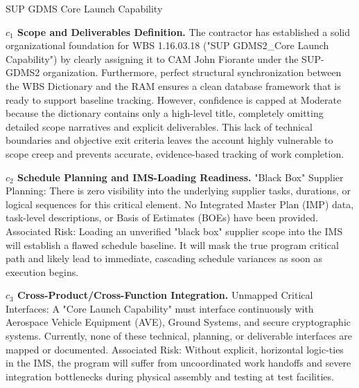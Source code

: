 \begin{frame}{SUP GDMS Core Launch Capability}
\begin{minipage}{0.90\textwidth}
\raggedright
\fontsize{8}{9.5}\selectfont
\textbf{\(c_1\) Scope and Deliverables Definition.}
The contractor has established a solid organizational foundation for WBS 1.16.03.18 ("SUP GDMS2\_Core Launch Capability") by clearly assigning it to CAM John Fiorante under the SUP-GDMS2 organization. Furthermore, perfect structural synchronization between the WBS Dictionary and the RAM ensures a clean database framework that is ready to support baseline tracking. However, confidence is capped at Moderate because the dictionary contains only a high-level title, completely omitting detailed scope narratives and explicit deliverables. This lack of technical boundaries and objective exit criteria leaves the account highly vulnerable to scope creep and prevents accurate, evidence-based tracking of work completion.\par\vspace{0.6em}
\textbf{\(c_2\) Schedule Planning and IMS-Loading Readiness.}
"Black Box" Supplier Planning: There is zero visibility into the underlying supplier tasks, durations, or logical sequences for this critical element. No Integrated Master Plan (IMP) data, task-level descriptions, or Basis of Estimates (BOEs) have been provided. Associated Risk: Loading an unverified "black box" supplier scope into the IMS will establish a flawed schedule baseline. It will mask the true program critical path and likely lead to immediate, cascading schedule variances as soon as execution begins.\par\vspace{0.6em}
\textbf{\(c_3\) Cross-Product/Cross-Function Integration.}
Unmapped Critical Interfaces: A "Core Launch Capability" must interface continuously with Aerospace Vehicle Equipment (AVE), Ground Systems, and secure cryptographic systems. Currently, none of these technical, planning, or deliverable interfaces are mapped or documented. Associated Risk: Without explicit, horizontal logic-ties in the IMS, the program will suffer from uncoordinated work handoffs and severe integration bottlenecks during physical assembly and testing at test facilities.\par\vspace{0.6em}
\end{minipage}
\end{frame}

\endinput
